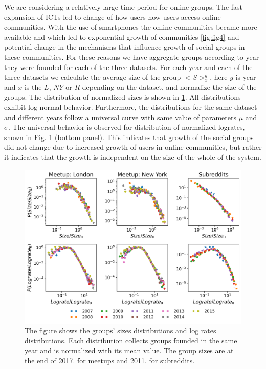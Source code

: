 We are considering a relatively large time period for online groups. The fast expansion of ICTs led to change of how users how users access online communities. With the use of smartphones the online communities became more available and which led to exponential growth of communities \ref{fig:fig4} and potential change in the mechanisms that influence growth of social groups in these communities. For these reasons we have aggregate groups according to year they were founded for each of the three datasets. For each year and each of the three datasets we calculate the average size of the group $<S>^{y}_{x}$, here $y$ is year and $x$ is the $L$, $NY$ or $R$ depending on the dataset, and normalize the size of the groups. The distribution of normalized sizes is shown in \ref{fig:scale}. All distributions exhibit log-normal behavior. Furthermore, the distributions for the same dataset and different years follow a universal curve with same value of parameters $\mu$ and $\sigma$. The universal behavior is observed for distribution of normalized logrates, shown in Fig. \ref{fig:scale} (bottom panel). This indicates that growth of the social groups did not change due to increased growth of users in online communities, but rather it indicates that the growth is independent on the size of the whole of the system.   

\begin{figure}[!h]
	\centering
	\includegraphics[width=0.8\linewidth]{Figures/Fig1.png}
	\caption{The figure shows the groups' sizes distributions and log rates distributions. Each distribution collects groups founded in the same year and is normalized with its mean value. The group sizes are at the end of 2017. for meetups and 2011. for subreddits. }
	\label{fig:scale}
\end{figure}

